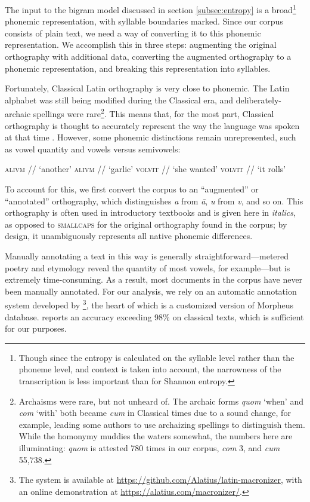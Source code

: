\documentclass[12pt,twoside]{article}
\newcommand{\ipa}[1]{/\textipa{#1}/}
\begin{document}
The input to the bigram model discussed in section \ref{subsec:entropy} is a broad\footnote{Though since the entropy is calculated on the syllable level rather than the phoneme level, and context is taken into account, the narrowness of the transcription is less important than for Shannon entropy.} phonemic representation, with syllable boundaries marked. Since our corpus consists of plain text, we need a way of converting it to this phonemic representation. We accomplish this in three steps: augmenting the original orthography with additional data, converting the augmented orthography to a phonemic representation, and breaking this representation into syllables.

Fortunately, Classical Latin orthography is very close to phonemic. The Latin alphabet was still being modified during the Classical era, and deliberately-archaic spellings were rare\footnote{Archaisms were rare, but not unheard of. The archaic forms \emph{quom} `when' and \emph{com} `with' both became \emph{cum} in Classical times due to a sound change, for example, leading some authors to use archaizing spellings to distinguish them. While the homonymy muddies the waters somewhat, the numbers here are illuminating: \emph{quom} is attested 780 times in our corpus, \emph{com} 3, and \emph{cum} 55,738.}. This means that, for the most part, Classical orthography is thought to accurately represent the way the language was spoken at that time \citep[9]{allen}. However, some phonemic distinctions remain unrepresented, such as vowel quantity and vowels versus semivowels:


\begin{exe}
\ex \textsc{alivm} \ipa{a.li.um} `another'
\ex \textsc{alivm} \ipa{a:.li.um} `garlic'
\ex \textsc{volvit} \ipa{wo.lu.it} `she wanted'
\ex \textsc{volvit} \ipa{wol.wit} `it rolls'
\end{exe}

To account for this, we first convert the corpus to an ``augmented'' or ``annotated'' orthography, which distinguishes \emph{a} from \emph{\=a}, \emph{u} from \emph{v}, and so on. This orthography is often used in introductory textbooks and is given here in \emph{italics}, as opposed to \textsc{smallcaps} for the original orthography found in the corpus; by design, it unambiguously represents all native phonemic differences.

Manually annotating a text in this way is generally straightforward---metered poetry and etymology reveal the quantity of most vowels, for example---but is extremely time-consuming. As a result, most documents in the corpus have never been manually annotated. For our analysis, we rely on an automatic annotation system developed by \citet{winge}\footnote{The system is available at \url{https://github.com/Alatius/latin-macronizer}, with an online demonstration at \url{https://alatius.com/macronizer/}.}, the heart of which is a customized version of  Morpheus database. \citet[27]{winge} reports an accuracy exceeding 98\% on classical texts, which is sufficient for our purposes.
\end{document}
